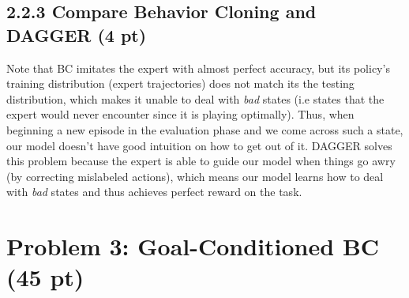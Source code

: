 \documentclass[12pt]{article}
\begin{document}
\subsection*{2.2.3 Compare Behavior Cloning and DAGGER (4 pt)}
\begin{tcolorbox}[fit,height=24em, width=40em, blank, borderline={1pt}{1pt},nobeforeafter]
            \begin{center}
                Note that BC imitates the expert with almost perfect accuracy, but its policy's training 
                distribution (expert trajectories) does not match its the testing distribution, which makes it 
                unable to deal with \textit{bad} states (i.e states that the expert would never encounter since it is playing optimally). 
                Thus, when beginning a new episode in the evaluation phase and we come across such a state, our model 
                doesn't have good intuition on how to get out of it. DAGGER solves this problem because the expert is able to guide 
                our model when things go awry (by correcting mislabeled actions), which means our model learns how to deal with \textit{bad} states 
                and thus achieves perfect reward on the task.
\end{center}
\end{tcolorbox}

\clearpage
\section*{Problem 3: Goal-Conditioned BC (45 pt)}
\end{document}
